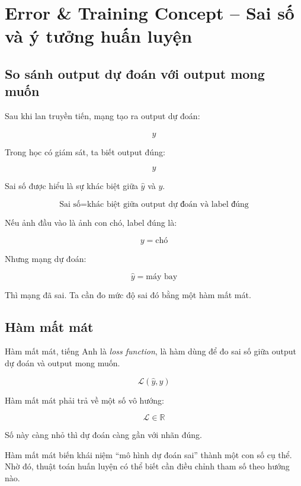 \section{Error \& Training Concept -- Sai số và ý tưởng huấn luyện}

\subsection{So sánh output dự đoán với output mong muốn}

Sau khi lan truyền tiến, mạng tạo ra output dự đoán:

\[
    \hat{y}
\]

Trong học có giám sát, ta biết output đúng:

\[
    y
\]

Sai số được hiểu là sự khác biệt giữa $\hat{y}$ và $y$.

\[
    \text{Sai số} = \text{khác biệt giữa output dự đoán và label đúng}
\]

\begin{vidu}
Nếu ảnh đầu vào là ảnh con chó, label đúng là:

\[
    y = \text{chó}
\]

Nhưng mạng dự đoán:

\[
    \hat{y} = \text{máy bay}
\]

Thì mạng đã sai. Ta cần đo mức độ sai đó bằng một hàm mất mát.
\end{vidu}

\subsection{Hàm mất mát}

Hàm mất mát, tiếng Anh là \textit{loss function}, là hàm dùng để đo sai số giữa output dự đoán và output mong muốn.

\[
    \mathcal{L}(\hat{y},y)
\]

Hàm mất mát phải trả về một số vô hướng:

\[
    \mathcal{L} \in \mathbb{R}
\]

Số này càng nhỏ thì dự đoán càng gần với nhãn đúng.

\begin{ghinho}
Hàm mất mát biến khái niệm ``mô hình dự đoán sai'' thành một con số cụ thể. Nhờ đó, thuật toán huấn luyện có thể biết cần điều chỉnh tham số theo hướng nào.
\end{ghinho}

